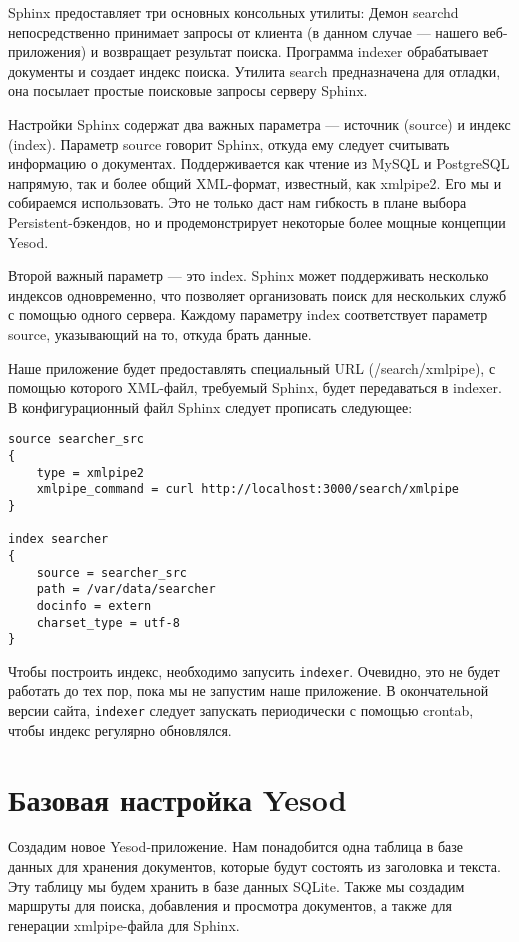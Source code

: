 Sphinx предоставляет три основных консольных утилиты: Демон searchd непосредственно принимает запросы от клиента (в данном случае --- нашего веб-приложения) и возвращает результат поиска. Программа indexer обрабатывает документы и создает индекс поиска. Утилита search предназначена для отладки, она посылает простые поисковые запросы серверу Sphinx.

Настройки Sphinx содержат два важных параметра --- источник (source) и индекс (index). Параметр source говорит Sphinx, откуда ему следует считывать информацию о документах. Поддерживается как чтение из MySQL и PostgreSQL напрямую, так и более общий XML-формат, известный, как xmlpipe2. Его мы и собираемся использовать. Это не только даст нам гибкость в плане выбора Persistent-бэкендов, но и продемонстрирует некоторые более мощные концепции Yesod.

Второй важный параметр --- это index. Sphinx может поддерживать несколько индексов одновременно, что позволяет организовать поиск для нескольких служб с помощью одного сервера. Каждому параметру index соответствует параметр source, указывающий на то, откуда брать данные.

Наше приложение будет предоставлять специальный URL (/search/xmlpipe), с помощью которого XML-файл, требуемый Sphinx, будет передаваться в indexer. В конфигурационный файл Sphinx следует прописать следующее:

\begin{lstlisting}
source searcher_src
{
    type = xmlpipe2
    xmlpipe_command = curl http://localhost:3000/search/xmlpipe
}

index searcher
{
    source = searcher_src
    path = /var/data/searcher
    docinfo = extern
    charset_type = utf-8
}
\end{lstlisting}

Чтобы построить индекс, необходимо запусить \lstinline'indexer'. Очевидно, это не будет работать до тех пор, пока мы не запустим наше приложение.  В окончательной версии сайта, \lstinline'indexer' следует запускать периодически с помощью crontab, чтобы индекс регулярно обновлялся.

\section{Базовая настройка Yesod} %


Создадим новое Yesod-приложение. Нам понадобится одна таблица в базе данных для хранения документов, которые будут состоять из заголовка и текста. Эту таблицу мы будем хранить в базе данных SQLite. Также мы создадим маршруты для поиска, добавления и просмотра документов, а также для генерации xmlpipe-файла для Sphinx.


